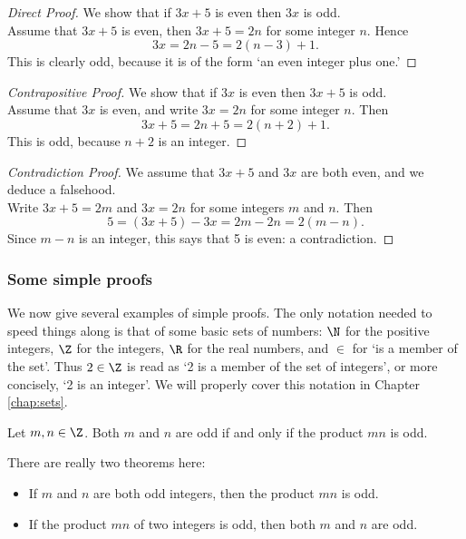 \begin{proof}[Direct Proof]
We show that if $3x+5$ is even then $3x$ is odd.\\[5pt]
Assume that $3x+5$ is even, then $3x+5=2n$ for some integer $n$. Hence
\[3x=2n-5=2(n-3)+1.\]
This is clearly odd, because it is of the form `an even integer plus one.'
\end{proof}

\begin{proof}[Contrapositive Proof]
We show that if $3x$ is even then $3x+5$ is odd.\\[5pt]
Assume that $3x$ is even, and write $3x=2n$ for some integer $n$. Then
\[3x+5=2n+5=2(n+2)+1.\]
This is odd, because $n+2$ is an integer.
\end{proof}

\begin{proof}[Contradiction Proof]
We assume that $3x+5$ and $3x$ are both even, and we deduce a falsehood.\\[5pt]
Write $3x+5=2m$ and $3x=2n$ for some integers $m$ and $n$. Then
\[5=(3x+5)-3x=2m-2n=2(m-n).\]
Since $m-n$ is an integer, this says that 5 is even: a contradiction.
\end{proof}


\subsubsection*{Some simple proofs}

We now give several examples of simple proofs. The only notation needed to speed things along is that of some basic sets of numbers: $\N$ for the positive integers, $\Z$ for the integers, $\R$ for the real numbers, and $\in$ for `is a member of the set'. Thus $2\in\Z$ is read as `2 is a member of the set of integers', or more concisely, `2 is an integer'. We will properly cover this notation in Chapter \ref{chap:sets}.

\begin{thm}\label{thm:oddprod}
Let $m,n\in\Z$. Both $m$ and $n$ are odd if and only if the product $mn$ is odd.
\end{thm}

\noindent There are really two theorems here:
\begin{itemize}
\item[]\itemstart{($\Rightarrow$)} If $m$ and $n$ are both odd integers, then the product $mn$ is odd.
\item[]\itemstart{($\Leftarrow$)} If the product $mn$ of two integers is odd, then both $m$ and $n$ are odd.
 \end{itemize}
 
